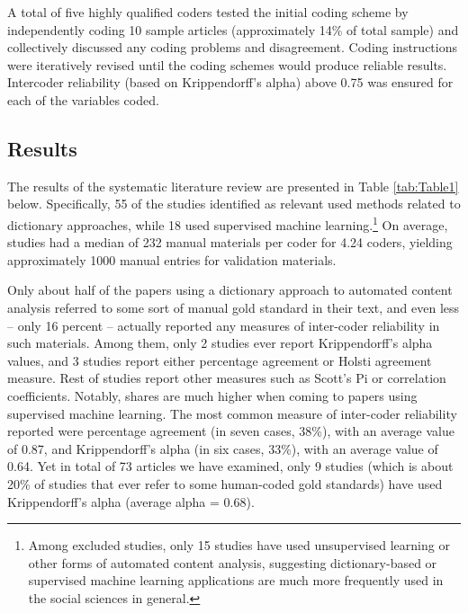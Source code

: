 \documentclass[man, 12pt, a4paper, nolmodern, noextraspace]{apa6}
\begin{document}
    A total of five highly qualified coders tested the initial coding scheme by independently coding 10 sample articles (approximately 14\% of total sample) and collectively discussed any coding problems and disagreement. Coding instructions were iteratively revised until the coding schemes would produce reliable results. Intercoder reliability (based on Krippendorff’s alpha) above 0.75 was ensured for each of the variables coded.   
    
\subsection{Results}

    The results of the systematic literature review are presented in Table \ref{tab:Table1} below. Specifically, 55 of the studies identified as relevant used methods related to dictionary approaches, while 18 used supervised machine learning.\footnote{Among excluded studies, only 15 studies have used unsupervised learning or other forms of automated content analysis, suggesting dictionary-based or supervised machine learning applications are much more frequently used in the social sciences in general.\label{fn:Study1}} On average, studies had a median of 232 manual materials per coder for 4.24 coders, yielding approximately 1000 manual entries for validation materials.
    
    Only about half of the papers using a dictionary approach to automated content analysis referred to some sort of manual gold standard in their text, and even less – only 16 percent – actually reported any measures of inter-coder reliability in such materials. Among them, only 2 studies ever report Krippendorff’s alpha values, and 3 studies report either percentage agreement or Holsti agreement measure. Rest of studies report other measures such as Scott's Pi or correlation coefficients. Notably, shares are much higher when coming to papers using supervised machine learning. The most common measure of inter-coder reliability reported were percentage agreement (in seven cases, 38\%), with an average value of 0.87, and Krippendorff’s alpha (in six cases, 33\%), with an average value of 0.64. Yet in total of 73 articles we have examined, only 9 studies (which is about 20\% of studies that ever refer to some human-coded gold standards) have used Krippendorff’s alpha (average alpha = 0.68). 
    
\end{document}
